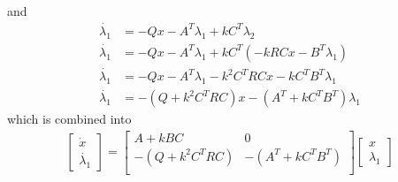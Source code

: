 and
\begin{equation}
    \begin{split}
        \dot{\lambda_1}&=-Qx-A^T\lambda_1+kC^T\lambda_2\\
        \dot{\lambda_1}&=-Qx-A^T\lambda_1+kC^T(-kRCx-B^T\lambda_1)\\
        \dot{\lambda_1}&=-Qx-A^T\lambda_1-k^2C^TRCx-kC^TB^T\lambda_1\\
        \dot{\lambda_1}&=-(Q+k^2C^TRC)x-(A^T+kC^TB^T)\lambda_1
    \end{split}
\end{equation}
which is combined into 
\begin{equation}
    \begin{split}
        \begin{bmatrix}
            \dot{x}\\\dot{\lambda_1}
        \end{bmatrix}=
        \begin{bmatrix}
            A+kBC& 0\\
            -(Q+k^2C^TRC)& -(A^T+kC^TB^T)\\
        \end{bmatrix}\begin{bmatrix}
            x\\\lambda_1
        \end{bmatrix}
    \end{split}
\end{equation}




